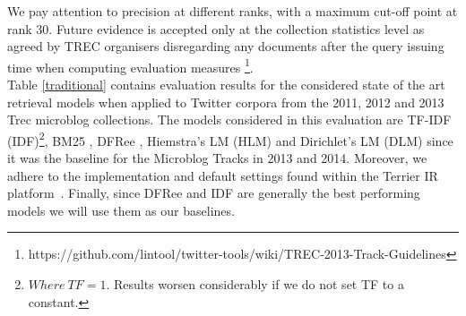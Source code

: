 

 We pay attention to precision at different ranks, with a maximum cut-off point at rank 30. Future evidence is accepted only at the collection statistics level as agreed by TREC organisers disregarding any documents after the query issuing time when computing evaluation measures \footnote{https://github.com/lintool/twitter-tools/wiki/TREC-2013-Track-Guidelines}.\\

 Table \ref{traditional} contains evaluation results for the considered state of the art retrieval models when applied to Twitter corpora from the 2011, 2012 and 2013 Trec microblog collections. The models considered in this evaluation are TF-IDF (IDF)\footnote{\(Where~TF=1.\) Results worsen considerably if we do not set TF to a constant.}, BM25 \cite{robertson1995okapi}, DFRee \cite{amati2003probabilistic}, Hiemstra's LM (HLM) \cite{hiemstra2001using} and Dirichlet's LM (DLM) \cite{blei2003latent} since it was the baseline for the Microblog Tracks in 2013 and 2014. Moreover, we adhere to the implementation and default settings found within the Terrier IR platform~\cite{ounis2005terrier}. Finally, since DFRee and IDF are generally the best performing models we will use them as our baselines.

